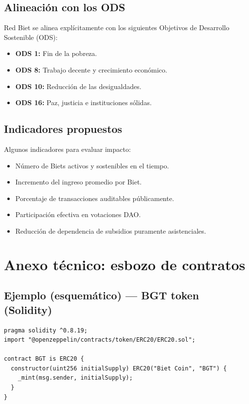 \documentclass[12pt]{report}
\begin{document}
\section{Alineación con los ODS}
Red Biet se alinea explícitamente con los siguientes Objetivos de Desarrollo Sostenible (ODS):
\begin{itemize}
    \item \textbf{ODS 1:} Fin de la pobreza.
    \item \textbf{ODS 8:} Trabajo decente y crecimiento económico.
    \item \textbf{ODS 10:} Reducción de las desigualdades.
    \item \textbf{ODS 16:} Paz, justicia e instituciones sólidas.
\end{itemize}

\section{Indicadores propuestos}
Algunos indicadores para evaluar impacto:
\begin{itemize}
    \item Número de Biets activos y sostenibles en el tiempo.
    \item Incremento del ingreso promedio por Biet.
    \item Porcentaje de transacciones auditables públicamente.
    \item Participación efectiva en votaciones DAO.
    \item Reducción de dependencia de subsidios puramente asistenciales.
\end{itemize}

\chapter{Anexo técnico: esbozo de contratos}

\section{Ejemplo (esquemático) — BGT token (Solidity)}
\begin{verbatim}
pragma solidity ^0.8.19;
import "@openzeppelin/contracts/token/ERC20/ERC20.sol";

contract BGT is ERC20 {
  constructor(uint256 initialSupply) ERC20("Biet Coin", "BGT") {
    _mint(msg.sender, initialSupply);
  }
}
\end{verbatim}
\end{document}
